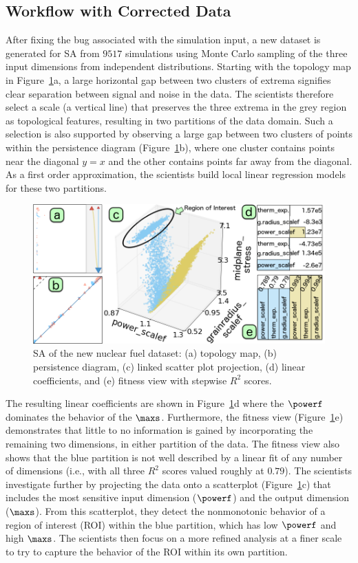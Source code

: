 \subsection{Workflow with Corrected Data}
\label{sec:workflow}
After fixing the bug associated with the simulation input, a new dataset is generated for SA from $9517$ simulations using Monte Carlo sampling of the three input dimensions from independent distributions.
%
Starting with the topology map in Figure~\ref{fig:bison}a, a large horizontal gap between two clusters of extrema signifies clear separation between signal and noise in the data.
%
The scientists therefore select a scale (a vertical line) that preserves the three extrema in the grey region as topological features, resulting in two partitions of the data domain.
%
Such a selection is also supported by observing a large gap between two clusters of points within the persistence diagram (Figure~\ref{fig:bison}b), where one cluster contains points near the diagonal $y=x$ and the other contains points far away from the diagonal.
%
As a first order approximation, the scientists build local linear regression models for these two partitions.

\begin{figure}[htbp]
  \centering
  \includegraphics[width=.48\textwidth]{figs/chap6/bison2}
  \caption{SA of the new nuclear fuel dataset:
  (a) topology map, (b) persistence diagram, (c) linked scatter plot projection,  (d) linear coefficients, and (e) fitness view with stepwise $R^2$ scores.
  }
  \label{fig:bison}
\end{figure}

The resulting linear coefficients are shown in Figure~\ref{fig:bison}d where the $\powerf$ dominates the behavior of the $\maxs$.
%
Furthermore, the fitness view (Figure~\ref{fig:bison}e) demonstrates that little to no information is gained by incorporating the remaining two dimensions, in either partition of the data.
%
The fitness view also shows that the blue partition is not well described by a linear fit of any number of dimensions (i.e., with all three $R^2$ scores valued roughly at $0.79$).
%
The scientists investigate further by projecting the data onto a scatterplot (Figure~\ref{fig:bison}c) that includes the most sensitive input dimension ($\powerf$) and the output dimension ($\maxs$).
%
From this scatterplot, they detect the nonmonotonic behavior of a region of interest (ROI) within the blue partition, which has low $\powerf$ and high $\maxs$.
%
The scientists then focus on a more refined analysis at a finer scale to try to capture the behavior of the ROI within its own partition.

